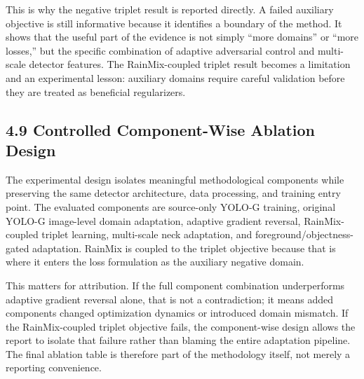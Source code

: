 \documentclass[
  11pt,
]{article}
\begin{document}
This is why the negative triplet result is reported directly. A failed
auxiliary objective is still informative because it identifies a
boundary of the method. It shows that the useful part of the evidence is
not simply ``more domains'' or ``more losses,'' but the specific
combination of adaptive adversarial control and multi-scale detector
features. The RainMix-coupled triplet result becomes a limitation and an
experimental lesson: auxiliary domains require careful validation before
they are treated as beneficial regularizers.

\hypertarget{controlled-component-wise-ablation-design}{%
\subsection{4.9 Controlled Component-Wise Ablation
Design}\label{controlled-component-wise-ablation-design}}

The experimental design isolates meaningful methodological components
while preserving the same detector architecture, data processing, and
training entry point. The evaluated components are source-only YOLO-G
training, original YOLO-G image-level domain adaptation, adaptive
gradient reversal, RainMix-coupled triplet learning, multi-scale neck
adaptation, and foreground/objectness-gated adaptation. RainMix is
coupled to the triplet objective because that is where it enters the
loss formulation as the auxiliary negative domain.

This matters for attribution. If the full component combination
underperforms adaptive gradient reversal alone, that is not a
contradiction; it means added components changed optimization dynamics
or introduced domain mismatch. If the RainMix-coupled triplet objective
fails, the component-wise design allows the report to isolate that
failure rather than blaming the entire adaptation pipeline. The final
ablation table is therefore part of the methodology itself, not merely a
reporting convenience.
\end{document}
